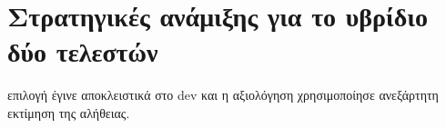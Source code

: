 \chapter{Στρατηγικές ανάμιξης για το υβρίδιο δύο τελεστών} επιλογή έγινε αποκλειστικά στο dev και η αξιολόγηση χρησιμοποίησε ανεξάρτητη εκτίμηση της αλήθειας.\n